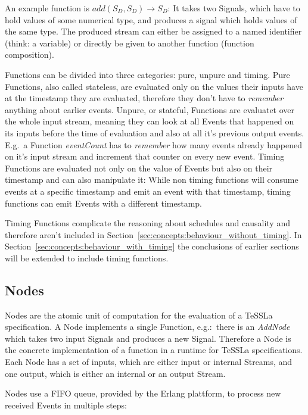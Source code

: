 An example function is \(add(S_D,S_D) \rightarrow S_D\): It takes two Signals, which have to hold values of some numerical type, and produces a signal which holds values of the same type.
The produced stream can either be assigned to a named identifier (think: a variable) or directly be given to another function (function composition).

Functions can be divided into three categories: pure, unpure and timing.
Pure Functions, also called stateless, are evaluated only on the values their inputs have at the timestamp they are evaluated, therefore they don't have to \emph{remember} anything about earlier events.
Unpure, or stateful, Functions are evaluatet over the whole input stream, meaning they can look at all Events that happened on its inputs before the time of evaluation and also at all it's previous output events.
E.g.\ a Function \emph{eventCount} has to \emph{remember} how many events already happened on it's input stream and increment that counter on every new event.
Timing Functions are evaluated not only on the value of Events but also on their timestamp and can also manipulate it:
While non timing functions will consume events at a specific timestamp and emit an event with that timestamp, timing functions can emit Events with a different timestamp.

Timing Functions complicate the reasoning about schedules and causality and therefore aren't included in Section~\ref{sec:concepts:behaviour_without_timing}.
In Section~\ref{sec:concepts:behaviour_with_timing} the conclusions of earlier sections will be extended to include timing functions.


\subsection{Nodes}
\label{sec:concepts:defs:nodes}

Nodes are the atomic unit of computation for the evaluation of a TeSSLa specification.
A Node implements a single Function, e.g.:\ there is an \emph{AddNode} which takes two input Signals and produces a new Signal.
Therefore a Node is the concrete implementation of a function in a runtime for TeSSLa specifications.
Each Node has a set of inputs, which are either input or internal Streams, and one output, which is either an internal or an output Stream.


Nodes use a FIFO queue, provided by the Erlang plattform, to process new received Events in multiple steps:

